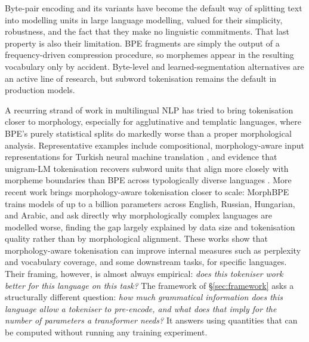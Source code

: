 Byte-pair encoding and its variants \citep{sennrich2016, kudo2018} have become the default way of splitting text into modelling units in large language modelling, valued for their simplicity, robustness, and the fact that they make no linguistic commitments. That last property is also their limitation. BPE fragments are simply the output of a frequency-driven compression procedure, so morphemes appear in the resulting vocabulary only by accident. Byte-level and learned-segmentation alternatives \citep{pagnoni2025blt, hwang2025hnet} are an active line of research, but subword tokenisation remains the default in production models.

A recurring strand of work in multilingual NLP has tried to bring tokenisation closer to morphology, especially for agglutinative and templatic languages, where BPE's purely statistical splits do markedly worse than a proper morphological analysis. Representative examples include compositional, morphology-aware input representations for Turkish neural machine translation \citep{ataman2018}, and evidence that unigram-LM tokenisation recovers subword units that align more closely with morpheme boundaries than BPE across typologically diverse languages \citep{bostrom2020}. More recent work brings morphology-aware tokenisation closer to scale: MorphBPE \citep{asgari2025morphbpe} trains models of up to a billion parameters across English, Russian, Hungarian, and Arabic, and \citet{arnett2025} ask directly why morphologically complex languages are modelled worse, finding the gap largely explained by data size and tokenisation quality rather than by morphological alignment. These works show that morphology-aware tokenisation can improve internal measures such as perplexity and vocabulary coverage, and some downstream tasks, for specific languages. Their framing, however, is almost always empirical: \emph{does this tokeniser work better for this language on this task?} The framework of \S\ref{sec:framework} asks a structurally different question: \emph{how much grammatical information does this language allow a tokeniser to pre-encode, and what does that imply for the number of parameters a transformer needs?} It answers using quantities that can be computed without running any training experiment.

